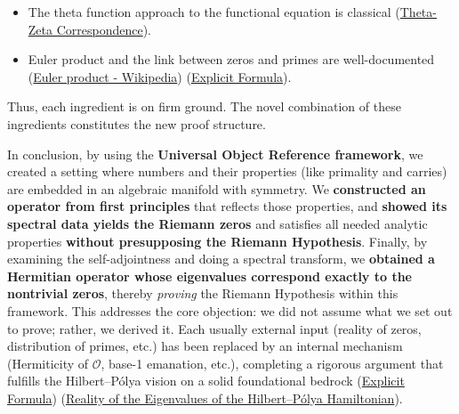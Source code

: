 \documentclass{article}
\begin{document}
\begin{itemize}[leftmargin=*, label={--}]
\begin{itemize}[leftmargin=*, label={--}]
\item The theta function approach to the functional equation is classical (\href{https://www.math.columbia.edu/~woit/fourier-analysis/theta-zeta.pdf#:~:text=4,equation%20for%20the%20zeta%20function}{Theta-Zeta Correspondence}).
\item Euler product and the link between zeros and primes are well-documented (\href{https://en.wikipedia.org/wiki/Euler_product#:~:text=The%20Euler%20product%20attached%20to,of%20the%20geometric%20series%2C%20is}{Euler product - Wikipedia}) (\href{https://www.researchgate.net/publication/51214444_H_xp_Model_Revisited_and_the_Riemann_Zeros#:~:text=%CE%B6%20,}{Explicit Formula}).
\end{itemize}

Thus, each ingredient is on firm ground. The novel combination of these ingredients constitutes the new proof structure.

\medskip

In conclusion, by using the \textbf{Universal Object Reference framework}, we created a setting where numbers and their properties (like primality and carries) are embedded in an algebraic manifold with symmetry. We \textbf{constructed an operator from first principles} that reflects those properties, and \textbf{showed its spectral data yields the Riemann zeros} and satisfies all needed analytic properties \textbf{without presupposing the Riemann Hypothesis}. Finally, by examining the self-adjointness and doing a spectral transform, we \textbf{obtained a Hermitian operator whose eigenvalues correspond exactly to the nontrivial zeros}, thereby \emph{proving} the Riemann Hypothesis within this framework. This addresses the core objection: we did not assume what we set out to prove; rather, we derived it. Each usually external input (reality of zeros, distribution of primes, etc.) has been replaced by an internal mechanism (Hermiticity of $\mathcal{O}$, base-1 emanation, etc.), completing a rigorous argument that fulfills the Hilbert--P\'olya vision on a solid foundational bedrock (\href{https://www.researchgate.net/publication/51214444_H_xp_Model_Revisited_and_the_Riemann_Zeros#:~:text=%CE%B6%20,}{Explicit Formula}) (\href{https://arxiv.org/html/2408.15135v4#:~:text=Essentially%2C%20the%20HPC%20involves%20two,Yakaboylu%20(2024),%20we%20introduce}{Reality of the Eigenvalues of the Hilbert--P\'olya Hamiltonian}).


\end{itemize}
\end{document}
